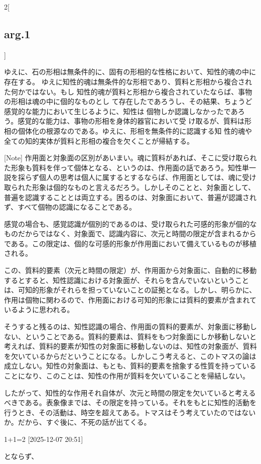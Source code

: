 \documentclass[paper=a4paper,fontsize=10pt,jafontsize=9pt,titlepage]{jlreq}
\begin{document}
\begin{paracol}{2}[\subsection{arg.1}]
\switchcolumn

ゆえに、石の形相は無条件的に、固有の形相的な性格において、知性的魂の中に存在する。
ゆえに知性的魂は無条件的な形相であり、質料と形相から複合された何かではない。もし
知性的魂が質料と形相から複合されていたならば、事物の形相は魂の中に個的なものとし
て存在したであろうし、その結果、ちょうど感覚的な能力において生じるように、知性は
個物しか認識しなかったであろう。感覚的な能力は、事物の形相を身体的器官において受
け取るが、質料は形相の個体化の根源なのである。ゆえに、形相を無条件的に認識する知
性的魂や全ての知的実体が質料と形相の複合を欠くことが帰結する。

 \iffalse

 [Note]
 作用面と対象面の区別があいまい。魂に質料があれば、そこに受け取られた形象も質料を伴って個体となる、というのは、作用面の話であろう。知性単一説を採らず個人の思考は個人に属するとするならば、作用面としては、魂に受け取られた形象は個的なものと言えるだろう。しかしそのことと、対象面として、普遍を認識することとは両立する。困るのは、対象面において、普遍が認識されず、すべて個物の認識になることである。

 感覚の場合も、感覚認識が個別的であるのは、受け取られた可感的形象が個的なものだからではなく、対象面で、認識内容に、次元と時間の限定が含まれるからである。この限定は、個的な可感的形象が作用面において備えているものが移植される。

この、質料的要素（次元と時間の限定）が、作用面から対象面に、自動的に移動するとすると、知性認識における対象面が、それらを含んでいないということは、可知的形象がそれらを担っていないことの証拠となる。しかし、明らかに、作用は個物に関わるので、作用面における可知的形象には質料的要素が含まれているように思われる。

 そうすると残るのは、知性認識の場合、作用面の質料的要素が、対象面に移動しない、ということである。質料的要素は、質料をもつ対象面にしか移動しないと考えれば、質料的要素が知性の対象面に移動しないのは、知性の対象面が、質料を欠いているからだということになる。しかしこう考えると、このトマスの論は成立しない。知性の対象面は、もとも、質料的要素を捨象する性質を持っていることになり、このことは、知性の作用が質料を欠いていることを帰結しない。

したがって、知性的な作用それ自体が、次元と時間の限定を欠いていると考えるべきである。表象像までは、その限定を持っている。それをもとに知性的活動を行うとき、その活動は、時空を超えてある。トマスはそう考えていたのではないか。だから、すぐ後に、不死の話が出てくる。

 1+1=2 [2025-12-07 20:51]

 とならず、


\end{paracol}
\end{document}
